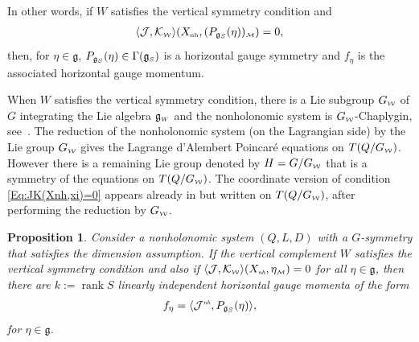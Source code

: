 \documentclass[10pt,a4paper]{amsart}
\numberwithin{equation}{section}
\newtheorem{Proposition}[Theorem]{Proposition}
 { \theoremstyle{definition}
\newtheorem{Definition}[Theorem]{Definition}
\newtheorem{Example}[Theorem]{Example}
\newtheorem{Remark}[Theorem]{Remark}
\newtheorem{Remarks}[Theorem]{Remarks} }
\def\W{\mathcal{W}}
\def\M{\mathcal{M}}
\def\J{\mathcal{J}}
\def\g{\mathfrak{g}}
\def\nh{{\mbox{\tiny{nh}}}}
\def\subW{{\mbox{\tiny{$\W$}}}}
\def\subM{{\mbox{\tiny{$\M$}}}}
\def\subSS{{\mbox{\tiny{$S$}}}}
\def\subWW{{\mbox{\tiny{$W$}}}}
\begin{document}
In other words, if $W$ satisf\/ies the
 vertical symmetry condition and
 \begin{gather}\label{Eq:JK(Xnh,xi)=0}
 \langle \mathcal{J},\mathcal{K}_\subW\rangle (X_{\nh},( P_{\mathfrak{g}_S}(\eta))_\subM ) = 0,
 \end{gather}
 then, for $\eta\in \mathfrak{g}$,  $P_{\mathfrak{g}_S}(\eta) \in \Gamma(\mathfrak{g}_\subSS)$
 is a horizontal gauge symmetry and $f_\eta$ is  the associated horizontal gauge momentum.

\begin{Remark}
 When $W$ satisf\/ies the vertical symmetry condition, there is a Lie subgroup $G_\subW$ of $G$ integrating the Lie algebra $\mathfrak{g}_\subWW$ and the nonholonomic system is $G_\subW$-Chaplygin, see~\cite{BF2015}.  The reduction of the nonholonomic system (on the Lagrangian side) by the Lie group $G_\subW$ gives the Lagrange d'Alembert Poincar\'e equations on $T(Q/G_\subW)$. However there is a remaining Lie group denoted by $H = G/G_\subW$ that is a symmetry of the equations on $T(Q/G_\subW)$.
 The coordinate version of condition \eqref{Eq:JK(Xnh,xi)=0} appears already in \cite[Theorem~6]{Zenkov} but written on $T(Q/G_\subW)$, after performing the reduction by $G_\subW$.
 \end{Remark}

\begin{Proposition}\label{P:RankS}
 Consider a nonholonomic system $(Q,L,D)$ with a $G$-symmetry that sa\-tis\-fies
 the dimension assumption. If the vertical complement $W$ satisfies the vertical
 symmetry condition and also if $\langle \J,\mathcal{K}_\subW\rangle(X_{\emph\nh}, \eta_\subM) = 0$
 for all $\eta\in \g$, then  there are $k:= \operatorname{rank} S$ linearly independent
 horizontal gauge momenta of the form
 \begin{gather}\label{Eq:f_eta}
   f_\eta = \langle \J^{\emph\nh}, P_{\g_S}(\eta)\rangle,
 \end{gather}
 for $\eta\in \g$.
\end{Proposition}
\end{document}
